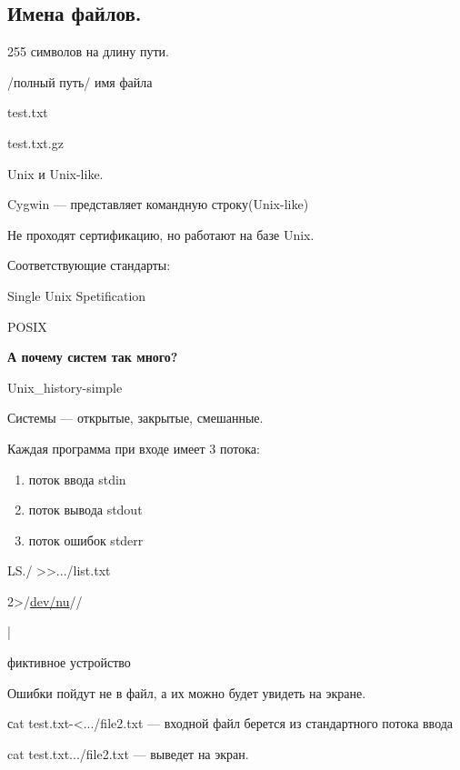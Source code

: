 \subsection {Имена файлов.}
\par 255 символов
на длину пути.
\par  /полный
путь/ имя файла

\par  test.txt
\par  test.txt.gz


\par Unix и
Unix-like.


\par Cygwin —
представляет командную строку(Unix-like)
\par Не
проходят сертификацию, но работают на
базе Unix.
\par Соответствующие
стандарты:
\par Single Unix
Spetification
\par POSIX


\par \textbf{А почему
систем так много?}
\par Unix\_history-simple


\par Системы
— открытые, закрытые, смешанные.


\par Каждая
программа при входе имеет 3 потока:
\begin{enumerate}
	\item \par поток
	ввода		stdin
	\item \par поток
	вывода 	stdout
	\item \par поток
	ошибок	stderr
\end{enumerate}
\par LS./
>>.../list.txt
\par  2>/\underline{dev/nu}//

\par         |
\par    фиктивное
устройство
\par Ошибки
пойдут не в файл, а их можно будет увидеть
на экране.
\par  сat
test.txt-<.../file2.txt — входной файл берется
из стандартного потока ввода
\par  cat
test.txt.../file2.txt — выведет на экран.
\par  


